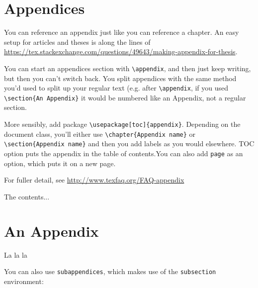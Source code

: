 \section{Appendices}

You can reference an appendix just like you can reference a chapter. An easy setup for articles and theses is along the lines of \url{https://tex.stackexchange.com/questions/49643/making-appendix-for-thesis}.

You can start an appendices section with \verb+\appendix+, and then just keep writing, but then you can't switch back. You split appendices with the same method you'd used to split up your regular text (e.g. after \verb+\appendix+, if you used \verb+\section{An Appendix}+ it would be numbered like an Appendix, not a regular section.


More sensibly, add package \verb+\usepackage[toc]{appendix}+. Depending on the document class, you'll either use \verb+\chapter{Appendix name}+ or \verb+\section{Appendix name}+ and then you add labels as you would elsewhere. TOC option puts the appendix in the table of contents.You can also add \verb+page+ as an option, which puts it on a new page.

For fuller detail, see \url{http://www.texfaq.org/FAQ-appendix}


\begin{appendices}

The contents...

\section{An Appendix}
La la la


\end{appendices}

You can also use \verb+subappendices+, which makes use of the \verb+subsection+ environment:

